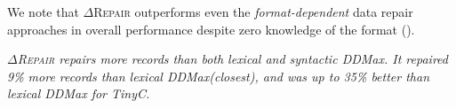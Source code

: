 \documentclass[acmsmall,screen,review,anonymous]{acmart}
\makeatletter
\newenvironment{result}{\begin{framed}\centering\it}{\end{framed}}
\newcommand{\formatdependent}{format-dependent\xspace}
\newcommand{\dtask}{data repair\xspace}
\def\Rincomplete{\texttt{\color{incompletecolor}\textbf{$\vartriangleright$}}\xspace}
\def\Rvalid{\texttt{\color{validcolor}\textbf{$\checkmark$}}\xspace}
\newcommand{\approach}{\textsc{$\Delta$Repair}\xspace}
\newcommand{\ddmax}{\textit{DDMax}\xspace}
\newcommand{\drepair}{\approach}
\newcommand\letterboxed[1]{%
\setlength{\fboxsep}{0pt}%
  \@tfor\@ii:=#1\do{%
    \fcolorbox{light-gray}{white}%
    {\texttt{\strut\@ii}}%
  }%
}
\makeatother
\begin{document}
%
%


% 


We note that \drepair outperforms even the \emph{\formatdependent} \dtask approaches
in overall performance despite zero knowledge of the format
().
% 


\begin{result}
\drepair repairs more records than both lexical and syntactic \ddmax.
It repaired 9\% more records than lexical \ddmax (closest), and was
up to 35\% better than lexical \ddmax for TinyC.
\end{result}
\end{document}
